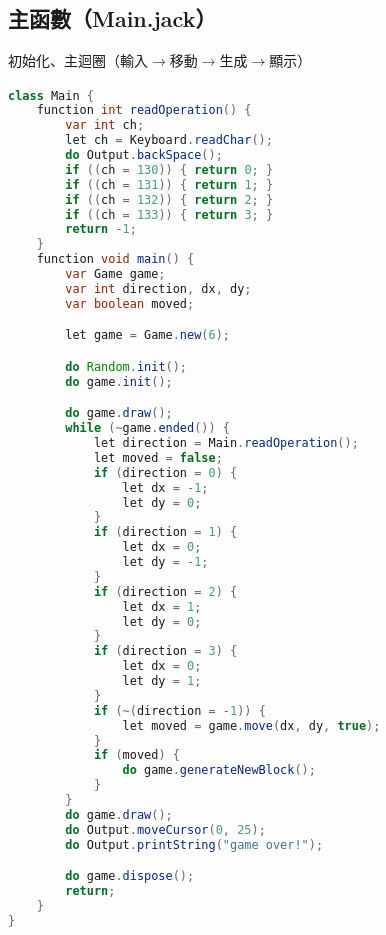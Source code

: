 \documentclass[pstricks, 12pt, a4paper]{article}
\newcommand{\then}[2][]{\xrightarrow[#1]{#2}}
\begin{document}
  \subsection{主函數（Main.jack）}
    初始化、主迴圈（輸入$\then{}$移動$\then{}$生成$\then{}$顯示）
    \begin{lstlisting}[language=Java, frame=single]
class Main {
    function int readOperation() {
        var int ch;
        let ch = Keyboard.readChar();
        do Output.backSpace();
        if ((ch = 130)) { return 0; }
        if ((ch = 131)) { return 1; }
        if ((ch = 132)) { return 2; }
        if ((ch = 133)) { return 3; }
        return -1;
    }
    function void main() {
        var Game game;
        var int direction, dx, dy;
        var boolean moved;

        let game = Game.new(6);

        do Random.init();
        do game.init();

        do game.draw();
        while (~game.ended()) {
            let direction = Main.readOperation();
            let moved = false;
            if (direction = 0) {
                let dx = -1;
                let dy = 0;
            }
            if (direction = 1) {
                let dx = 0;
                let dy = -1;
            }
            if (direction = 2) {
                let dx = 1;
                let dy = 0;
            }
            if (direction = 3) {
                let dx = 0;
                let dy = 1;
            }
            if (~(direction = -1)) {
                let moved = game.move(dx, dy, true);
            }
            if (moved) {
                do game.generateNewBlock();
            }
        }
        do game.draw();
        do Output.moveCursor(0, 25);
        do Output.printString("game over!");

        do game.dispose();
        return;
    }
}
    \end{lstlisting}
\end{document}
